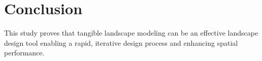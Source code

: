 \documentclass[Afour,sageh,times]{sagej}
\begin{document}
%








\clearpage

\section{Conclusion}
This study proves that tangible landscape modeling
can be an effective landscape design tool
enabling a rapid, iterative design process and
enhancing spatial performance.


\end{document}

